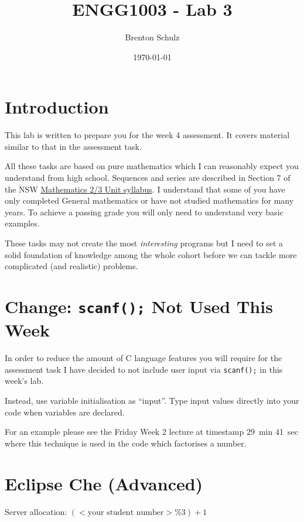 \documentclass{lab}
\title{ENGG1003 - Lab 3}
\author{Brenton Schulz}
\date{\today}
\begin{document}
\maketitle

\section{Introduction}

This lab is written to prepare you for the week 4 assessment. It covers material similar to that in the assessment task.

All these tasks are based on pure mathematics which I can reasonably expect you understand from high school. Sequences and series are described in Section 7 of the NSW \underline{\href{https://educationstandards.nsw.edu.au/wps/portal/nesa/11-12/stage-6-learning-areas/stage-6-mathematics/mathematics-syllabus}{Mathematics 2/3 Unit syllabus}}. I understand that some of you have only completed General mathematics or have not studied mathematics for many years. To achieve a passing grade you will only need to understand very basic examples.

These tasks may not create the most \textit{interesting} programs but I need to set a solid foundation of knowledge among the whole cohort before we can tackle more complicated (and realistic) problems.

\section{Change: \texttt{scanf();} Not Used This Week}

In order to reduce the amount of C language features you will require for the assessment task I have decided to not include user input via \texttt{scanf();} in this week's lab.

Instead, use variable initialisation as ``input''. Type input values directly into your code when variables are declared.

For an example please see the Friday Week 2 lecture at timestamp 29~min 41~sec where this technique is used in the code which factorises a number.

\section{Eclipse Che (Advanced)}

{\LARGE Server allocation: $(<\textrm{your student number}> \texttt{\%} 3) + 1$}
\end{document}
